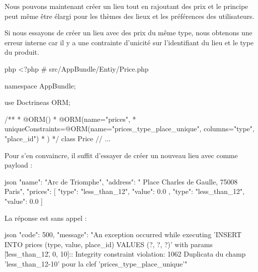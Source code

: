 \documentclass[big]{zmdocument}
\begin{document}
Nous pouvons maintenant créer un lieu tout en rajoutant des prix et le principe peut même être élargi pour les thèmes des lieux et les préférences des utilisateurs.







Si nous essayons de créer un lieu avec des prix du même type, nous obtenons une erreur interne car il y a une contrainte d'unicité sur l'identifiant du lieu et le type du produit.



\begin{CodeBlock}{php}
<?php
# src/AppBundle/Entiy/Price.php

namespace AppBundle\Entity;

use Doctrine\ORM\Mapping as ORM;

/**
 * @ORM\Entity()
 * @ORM\Table(name="prices",
 *      uniqueConstraints={@ORM\UniqueConstraint(name="prices_type_place_unique", columns={"type", "place_id"})}
 * )
 */
class Price
{
    // ...
}
\end{CodeBlock}



Pour s'en convaincre, il suffit d'essayer de créer un nouveau lieu avec comme payload :



\begin{CodeBlock}{json}
{
    "name": "Arc de Triomphe",
    "address": " Place Charles de Gaulle, 75008 Paris",
    "prices": [
        {
            "type": "less_than_12",
            "value": 0.0
        },
        {
            "type": "less_than_12",
            "value": 0.0
        } 
    ]
}
\end{CodeBlock}



La réponse est sans appel :



\begin{CodeBlock}{json}
{
  "code": 500,
  "message": "An exception occurred while executing 'INSERT INTO prices (type, value, place_id) VALUES (?, ?, ?)' with params [\"less_than_12\", 0, 10]:\n\nSQLSTATE[23000]: Integrity constraint violation: 1062 Duplicata du champ 'less_than_12-10' pour la clef 'prices_type_place_unique'"
}
\end{CodeBlock}
\end{document}
